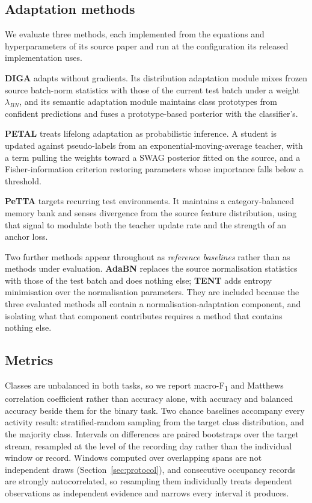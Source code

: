 \documentclass[a4paper,fleqn]{cas-dc}
\begin{document}
\subsection{Adaptation methods}

We evaluate three methods, each implemented from the equations and hyperparameters of its
source paper and run at the configuration its released implementation uses.

\textbf{DIGA} \cite{diga} adapts without gradients. Its distribution adaptation module
mixes frozen source batch-norm statistics with those of the current test batch under a
weight $\lambda_{BN}$, and its semantic adaptation module maintains class prototypes from
confident predictions and fuses a prototype-based posterior with the classifier's.

\textbf{PETAL} \cite{petal} treats lifelong adaptation as probabilistic inference. A
student is updated against pseudo-labels from an exponential-moving-average teacher, with a
term pulling the weights toward a SWAG posterior fitted on the source, and a
Fisher-information criterion restoring parameters whose importance falls below a threshold.

\textbf{PeTTA} \cite{petta} targets recurring test environments. It maintains a
category-balanced memory bank and senses divergence from the source feature distribution,
using that signal to modulate both the teacher update rate and the strength of an anchor
loss.

Two further methods appear throughout as \emph{reference baselines} rather than as methods
under evaluation. \textbf{AdaBN} replaces the source normalisation statistics with those of
the test batch and does nothing else; \textbf{TENT} \cite{tent} adds entropy minimisation
over the normalisation parameters. They are included because the three evaluated methods
all contain a normalisation-adaptation component, and isolating what that component
contributes requires a method that contains nothing else.

\subsection{Metrics}

Classes are unbalanced in both tasks, so we report macro-F\textsubscript{1} and Matthews
correlation coefficient rather than accuracy alone, with accuracy and balanced accuracy
beside them for the binary task. Two chance baselines accompany every activity result:
stratified-random sampling from the target class distribution, and the majority class.
Intervals on differences are paired bootstraps over the target stream, resampled at the
level of the recording day rather than the individual window or record. Windows computed
over overlapping spans are not independent draws (Section~\ref{sec:protocol}), and
consecutive occupancy records are strongly autocorrelated, so resampling them individually
treats dependent observations as independent evidence and narrows every interval it
produces.
\end{document}

